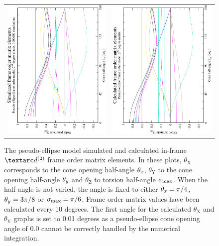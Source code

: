 \begin{figure}
\begin{tabular}{@{}cc@{}}
    \\[-5pt]
    \includegraphics[width=.35\textwidth,angle=270]{images/frame_order_matrix/Sijkl_pseudo-ellipse_in_frame_theta_z_ens1000000.eps} &
    \includegraphics[width=.35\textwidth,angle=270]{images/frame_order_matrix/Sijkl_pseudo-ellipse_in_frame_theta_z_calc.eps} \\
  \end{tabular}
  \caption[Pseudo-ellipse simulated and calculated in-frame $\FOtwo$ elements.]{
    The pseudo-ellipse model simulated and calculated in-frame $\FOtwo$ frame order matrix elements.
    In these plots, $\theta_\textrm{X}$ corresponds to the cone opening half-angle $\theta_x$, $\theta_\textrm{Y}$ to the cone opening half-angle $\theta_y$ and $\theta_\textrm{Z}$ to torsion half-angle $\sigma_\textrm{max}$.
    When the half-angle is not varied, the angle is fixed to either $\theta_x = \pi/4$, $\theta_y = 3\pi/8$ or $\sigma_\textrm{max} = \pi/6$.
    Frame order matrix values have been calculated every 10 degrees.
    The first angle for the calculated $\theta_\textrm{X}$ and $\theta_\textrm{Y}$ graphs is set to 0.01 degrees as a pseudo-ellipse cone opening angle of 0.0 cannot be correctly handled by the numerical integration.
  }
  \label{fig: simulated and calculated in-frame 2nd degree pseudo-ellipse frame order}
\end{figure}

